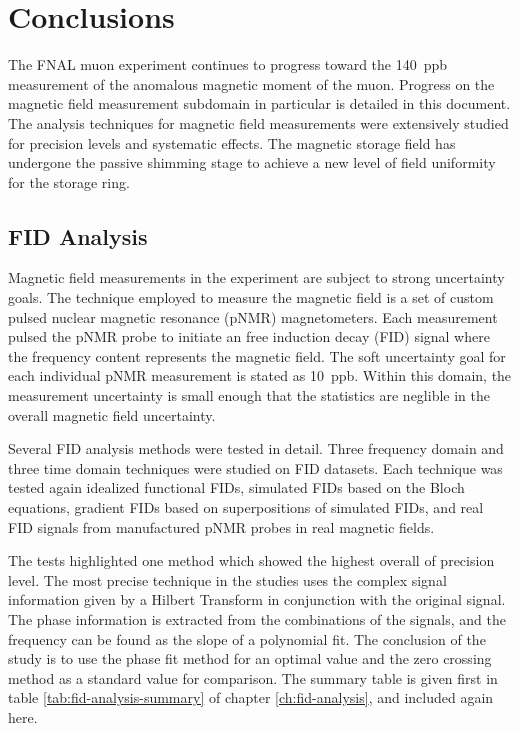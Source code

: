 \chapter{Conclusions}

The FNAL muon \gmtwo experiment continues to progress toward the \SI{140}{ppb} measurement of the anomalous magnetic moment of the muon.  Progress on the magnetic field measurement subdomain in particular is detailed in this document.  The analysis techniques for magnetic field measurements were extensively studied for precision levels and systematic effects.  The magnetic storage field has undergone the passive shimming stage to achieve a new level of field uniformity for the \gmtwo storage ring.

\section{FID Analysis}

Magnetic field measurements in the \mugmtwo experiment are subject to strong uncertainty goals.  The technique employed to measure the magnetic field is a set of custom pulsed nuclear magnetic resonance (pNMR) magnetometers.  Each measurement pulsed the pNMR probe to initiate an free induction decay (FID) signal where the frequency content represents the magnetic field.  The soft uncertainty goal for each individual pNMR measurement is stated as \SI{10}{ppb}.  Within this domain, the measurement uncertainty is small enough that the statistics are neglible in the overall magnetic field uncertainty.

Several FID analysis methods were tested in detail.  Three frequency domain and three time domain techniques were studied on FID datasets.  Each technique was tested again idealized functional FIDs, simulated FIDs based on the Bloch equations, gradient FIDs based on superpositions of simulated FIDs, and real FID signals from manufactured pNMR probes in real magnetic fields.  

The tests highlighted one method which showed the highest overall of precision level.  The most precise technique in the studies uses the complex signal information given by a Hilbert Transform in conjunction with the original signal.  The phase information is extracted from the combinations of the signals, and the frequency can be found as the slope of a polynomial fit.  The conclusion of the study is to use the phase fit method for an optimal value and the zero crossing method as a standard value for comparison.  The summary table is given first in table \ref{tab:fid-analysis-summary} of chapter \ref{ch:fid-analysis}, and included again here.

